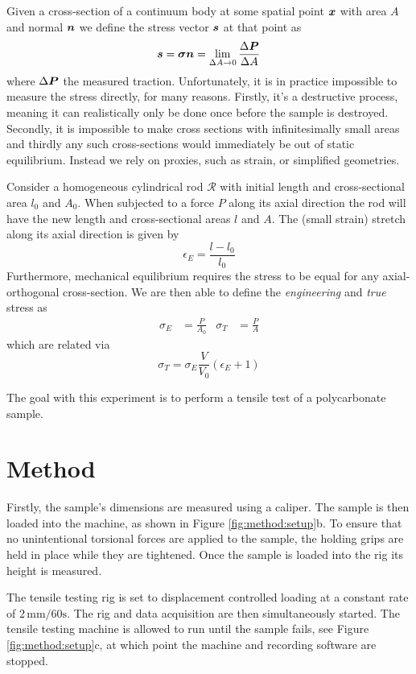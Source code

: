 \documentclass[5p,a4paper]{elsarticle}
\newcommand{\bm}[1]{\text{\boldmath{$#1$}}}
\begin{document}
	Given a cross-section of a continuum body at some spatial point $\bm{x}$ with area $A$ and normal $\bm{n}$ we define the stress vector $\bm{s}$ at that point as
	$$
		\bm{s} = \bm{\sigma}\bm{n} = \lim_{\Delta A \rightarrow 0} \frac{\Delta \bm{P}}{\Delta A}
	$$
	where $\Delta \bm{P}$ the measured traction. Unfortunately, it is in practice impossible to measure the stress directly, for many reasons. Firstly, it's a destructive process, meaning it can realistically only be done once before the sample is destroyed. Secondly, it is impossible to make cross sections with infinitesimally small areas and thirdly any such cross-sections would immediately be out of static equilibrium. Instead we rely on proxies, such as strain, or simplified geometries.
	
	
	Consider a homogeneous cylindrical rod $\mathcal{R}$ with initial length and cross-sectional area $l_0$ and $A_0$. When subjected to a force $P$ along its axial direction the rod will have the new length and cross-sectional areas $l$ and $A$. The (small strain) stretch along its axial direction is given by 
	$$
		\epsilon_E = \frac{l-l_0}{l_0} %
	$$
	Furthermore, mechanical equilibrium requires the stress to be equal for any axial-orthogonal cross-section. We are then able to define the \textit{engineering} and \textit{true} stress as
	\begin{align*}
		\sigma_E 	& = \frac{P}{A_0} %
		& \sigma_T	& = \frac{P}{A}
	\end{align*}
	which are related via 
	\begin{equation*}
		\sigma_T = \sigma_E\frac{V}{V_0}\left(\epsilon_E + 1\right)
	\end{equation*}
	
	The goal with this experiment is to perform a tensile test of a polycarbonate sample.
	
	\section{Method}
	Firstly, the sample's dimensions are measured using a caliper. The sample is then loaded into the machine, as shown in Figure \ref{fig:method:setup}b. To ensure that no unintentional torsional forces are applied to the sample, the holding grips are held in place while they are tightened. Once the sample is loaded into the rig its height is measured.
	
	The tensile testing rig is set to displacement controlled loading at a constant rate of $2\,\text{mm}/60\text{s}$. The rig and data acquisition are then simultaneously started. The tensile testing machine is allowed to run until the sample fails, see Figure \ref{fig:method:setup}c, at which point the machine and recording software are stopped.
	
\end{document}
